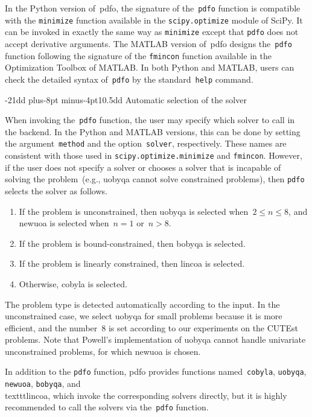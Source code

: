 \documentclass[smallextended,final]{svjour3}
\makeatletter
\def\subsection{\@startsection{subsection}{2}{\z@}%
    {-21dd plus-8pt minus-4pt}{10.5dd}
    {\normalsize\bfseries}}
\newcommand{\modified}[1]{\texorpdfstring{{\color{RoyalBlue}#1}}{#1}}
\makeatother
\begin{document}
In the Python version of~\gls{pdfo}, the signature of the~\texttt{pdfo} function is compatible with the \texttt{minimize} function available in the \texttt{scipy.optimize} module of SciPy.
It can be invoked in exactly the same way as \texttt{minimize} except that \texttt{pdfo} does not accept derivative arguments.
The MATLAB version of~\gls{pdfo} designs the~\texttt{pdfo} function following the signature of the \texttt{fmincon} function available in the Optimization Toolbox of MATLAB.
In both Python and MATLAB, users can check the detailed syntax of~\texttt{pdfo} by the standard~\texttt{help} command.

\subsection{Automatic selection of the solver}
\label{subsec:solver-selection}

When invoking the~\texttt{pdfo} function, the user may specify which solver to call in the backend.
\modified{%
    In the Python and MATLAB versions, this can be done by setting the argument~\texttt{method} and the option~\texttt{solver}, respectively.
    These names are consistent with those used in \texttt{scipy.optimize.minimize} and \texttt{fmincon}.}
However, if the user does not \modified{specify a solver} or chooses a solver that is incapable of solving the problem~(e.g., \gls{uobyqa} cannot solve constrained problems), then \texttt{pdfo} selects the solver as follows.
\begin{enumerate}
    \item If the problem is unconstrained, then \gls{uobyqa} is selected when~$2 \le n \le 8$, and \gls{newuoa} is selected when~$n = 1$ or~$n > 8$.
    \item If the problem is bound-constrained, then \gls{bobyqa} is selected.
    \item If the problem is linearly constrained, then \gls{lincoa} is selected.
    \item Otherwise, \gls{cobyla} is selected.
\end{enumerate}
The problem type is detected automatically according to the input.
In the unconstrained case, we select \gls{uobyqa} for small problems because it is more efficient, and the number~\num{8} is set according to our experiments on the CUTEst~\cite{Gould_Orban_Toint_2015} problems.
Note that Powell's implementation of \gls{uobyqa} cannot handle univariate unconstrained problems, for which \gls{newuoa} is chosen.

In addition to the \texttt{pdfo} function, \gls{pdfo} provides functions named~\texttt{cobyla}, \texttt{uobyqa}, \texttt{newuoa}, \texttt{bobyqa}, and~\\texttt{lincoa}, which invoke the corresponding solvers directly, but it is highly recommended to call the solvers via the~\texttt{pdfo} function.
\end{document}
